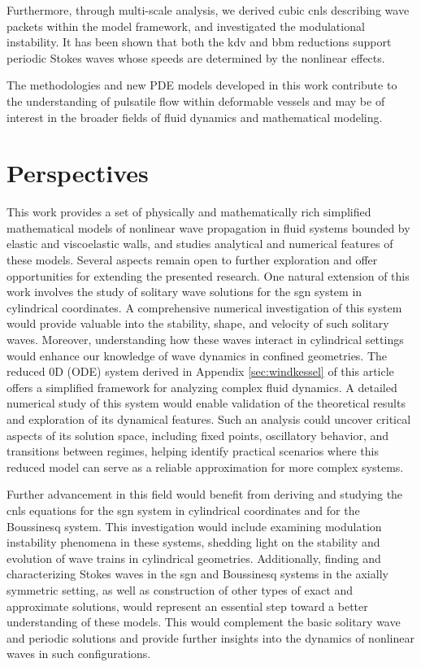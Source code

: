 \documentclass[alpha-refs, 12pt]{wiley-article}
\begin{document}
Furthermore, through multi-scale analysis, we derived cubic \acrfull{cnls} describing wave packets within the model framework, and investigated the modulational instability. It has been shown that both
the \acrshort{kdv} and \acrshort{bbm} reductions support periodic Stokes waves whose speeds are determined by the nonlinear effects.

The methodologies and new PDE models developed in this work contribute to the understanding of pulsatile flow within deformable vessels and may be of interest in the broader fields of fluid dynamics and mathematical modeling. 

\section{Perspectives}\label{sec:perspectives}

This work provides a set of physically and mathematically rich simplified mathematical models of nonlinear wave propagation in fluid systems bounded by elastic and viscoelastic walls, and studies analytical and numerical features of these models. Several aspects remain open to further exploration and offer opportunities for extending the presented research. One natural extension of this work involves the study of solitary wave solutions for the \acrfull{sgn} system in cylindrical coordinates. A comprehensive numerical investigation of this system would provide valuable into the stability, shape, and velocity of such solitary waves. Moreover, understanding how these waves interact in cylindrical settings would enhance our knowledge of wave dynamics in confined geometries. The reduced 0D (ODE) system derived in Appendix \ref{sec:windkessel} of this article offers a simplified framework for analyzing complex fluid dynamics. A detailed numerical study of this system would enable validation of the theoretical results and exploration of its dynamical features. Such an analysis could uncover critical aspects of its solution space, including fixed points, oscillatory behavior, and transitions between regimes, helping identify practical scenarios where this reduced model can serve as a reliable approximation for more complex systems.

Further advancement in this field would benefit from deriving and studying the \acrfull{cnls} equations for the \acrshort{sgn} system in cylindrical coordinates and for the Boussinesq system. This investigation would include examining modulation instability phenomena in these systems, shedding light on the stability and evolution of wave trains in cylindrical geometries. Additionally, finding and characterizing Stokes waves in the \acrshort{sgn} and Boussinesq systems in the axially symmetric setting, as well as construction of other types of exact and approximate solutions, would represent an essential step toward a better understanding of these models. This would complement the basic solitary wave and periodic solutions and provide further insights into the dynamics of nonlinear waves in such configurations.
\end{document}

